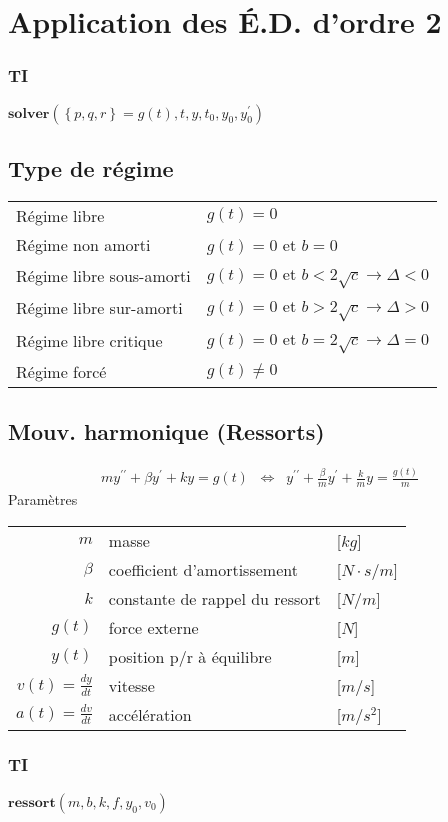 \section{Application des É.D. d'ordre 2}
\subsubsection{TI}
\centering
\(\mathbf{solver}(\left\{p,q,r\right\}=g(t),t,y,t_0,y_0,y^{\prime}_0)\)\\

\subsection{Type de régime}
\begin{tabular}{ll}
Régime libre & \(g(t)=0\)\\
Régime non amorti & \(g(t)=0\) et \(b=0\)\\
Régime libre sous-amorti & \(g(t)=0\) et \(b<2\sqrt{c} \rightarrow \Delta <0\)\\
Régime libre sur-amorti & \(g(t)=0\) et \(b>2\sqrt{c} \rightarrow \Delta >0\)\\
Régime libre critique & \(g(t)=0\) et \(b=2\sqrt{c} \rightarrow \Delta = 0\)\\
Régime forcé & \(g(t)\neq 0\)
\end{tabular}
\raggedright

\subsection{Mouv. harmonique (Ressorts)}
\vspace{-1\baselineskip}
\begin{gather*}
m y^{\prime\prime} + \beta y^{\prime} + ky = g(t) \;\;\Longleftrightarrow\;\;
y^{\prime\prime} + \frac{\beta}{m} y^{\prime} + \frac{k}{m}y = \frac{g(t)}{m}
\end{gather*}
Paramètres
\begin{tabular}{rll}
  $m$ & masse & [$kg$]\\
  $\beta$ & coefficient d'amortissement & [$N\cdot s/m$]\\
  $k$ & constante de rappel du ressort & [$N/m$]\\
  $g(t)$ & force externe & [$N$]\\
  $y(t)$ & position p/r à équilibre & [$m$]\\
  $v(t)=\frac{dy}{dt}$ & vitesse & [$m/s$]\\
  $a(t)=\frac{dv}{dt}$ & accélération & [$m/s^2$]
\end{tabular}


\subsubsection{TI}
\centering
\(\mathbf{ressort}(m,b,k,f,y_0,v_0)\)\\